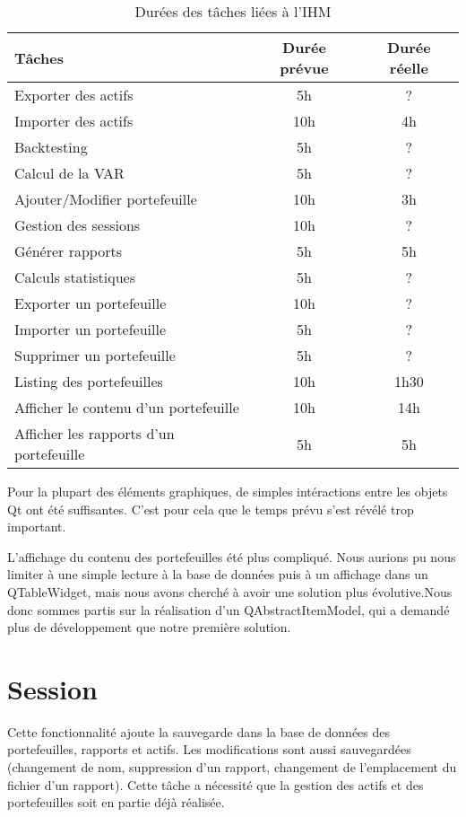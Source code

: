 \documentclass[a4paper]{report}
\begin{document}
\begin{table}[H]
\centering
  \begin{tabularx}{0.8\textwidth}{| X | c | c |}
    \hline
	Tâches & Durée prévue & Durée réelle \\
    \hline
    Exporter des actifs & 5h & ?\\
    Importer des actifs & 10h & 4h\\
    Backtesting & 5h & ?\\
    Calcul de la VAR & 5h & ?\\
    Ajouter/Modifier portefeuille & 10h & 3h\\
    Gestion des sessions & 10h & ?\\
    Générer rapports & 5h & 5h\\
    Calculs statistiques & 5h & ?\\
    Exporter un portefeuille & 10h & ?\\
    Importer un portefeuille & 5h & ?\\
    Supprimer un portefeuille & 5h & ?\\
    Listing des portefeuilles & 10h & 1h30\\
    Afficher le contenu d'un portefeuille & 10h & 14h\\
    Afficher les rapports d'un portefeuille & 5h & 5h\\
    \hline
  \end{tabularx}
  \caption{Durées des tâches liées à l'IHM}
\end{table}

Pour la plupart des éléments graphiques, de simples intéractions entre les objets Qt ont été suffisantes.
C'est pour cela que le temps prévu s'est révélé trop important.

L'affichage du contenu des portefeuilles été plus compliqué.
Nous aurions pu nous limiter à une simple lecture à la base de données puis à un affichage dans un QTableWidget, mais nous avons cherché à avoir une solution plus évolutive.Nous donc sommes partis sur la réalisation d'un QAbstractItemModel, qui a demandé plus de développement que notre première solution.


\section{Session}

Cette fonctionnalité ajoute la sauvegarde dans la base de données des portefeuilles, rapports et actifs.
Les modifications sont aussi sauvegardées (changement de nom, suppression d'un rapport, changement de l'emplacement du fichier d'un rapport).
Cette tâche a nécessité que la gestion des actifs et des portefeuilles soit en partie déjà réalisée.
\end{document}
